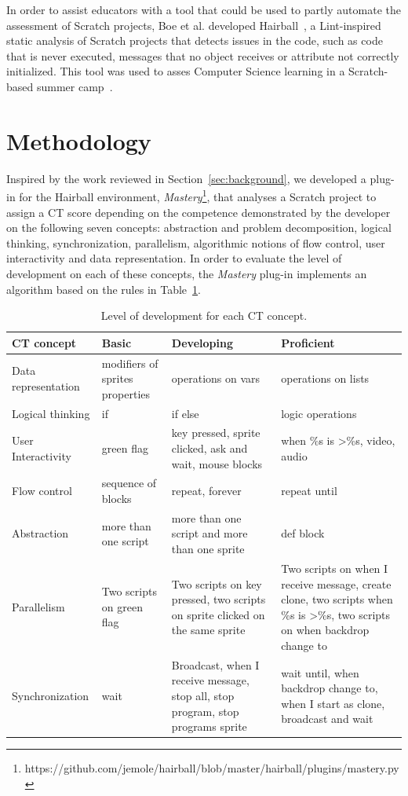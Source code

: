 \documentclass[a4paper,11pt]{article}
\begin{document}
In order to assist educators with a tool that could be used to partly automate the assessment of Scratch projects, Boe et al. developed Hairball~\cite{boe2013hairball}, a Lint-inspired static analysis of Scratch projects that detects issues in the code, such as code that is never executed, messages that no object receives or attribute not correctly initialized. This tool was used to asses Computer Science learning in a Scratch-based summer camp~\cite{franklin2013assessment}. 

\section{Methodology}
\label{sec:methodology}

Inspired by the work reviewed in Section~\ref{sec:background}, we developed a plug-in for the Hairball environment, \textit{Mastery}\footnote{https://github.com/jemole/hairball/blob/master/hairball/plugins/mastery.py}, that analyses a Scratch project to assign a CT score depending on the competence demonstrated by the developer on the following seven concepts: abstraction and problem decomposition, logical thinking, synchronization, parallelism, algorithmic notions of flow control, user interactivity and data representation. In order to evaluate the level of development on each of these concepts, the \textit{Mastery} plug-in implements an algorithm based on the rules in Table~\ref{table:CTscore}.

\begin{table}[t]
\centering
\begin{tabular}{|l|p{2.7cm}|p{3cm}|p{4cm}|}
\hline
CT concept & Basic & Developing & Proficient\\ %
\hline
\hline  
Data representation & modifiers of sprites properties &
operations on vars & operations on lists  \\
\hline
Logical thinking & if & if else & logic operations \\ 
\hline
User Interactivity & green flag & key pressed, sprite clicked, ask and wait,
mouse blocks & when \%s is \textgreater \%s, video, audio \\ 
\hline
Flow control & sequence of blocks & repeat, forever & repeat until \\ 
\hline
Abstraction & more than one script & more than one script and more than one sprite & def block\\
\hline
Parallelism & Two scripts on green flag & Two scripts on key pressed, two scripts on sprite clicked on the same sprite & Two scripts on when I receive message, create clone, two scripts when \%s is \textgreater \%s, two scripts on when backdrop change to \\
\hline
Synchronization & wait & Broadcast, when I receive message, stop all, stop program, stop programs sprite & wait until, when backdrop change to, when I start as clone, broadcast and wait \\ 
\hline
\end{tabular}
\caption{Level of development for each CT concept.}
\label{table:CTscore}
\end{table}
\end{document}
